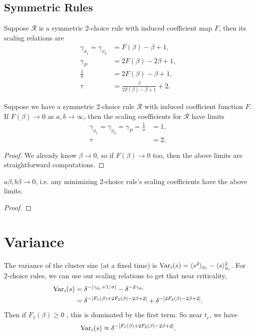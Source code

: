 \documentclass[twoside,10pt]{article}
\begin{document}
\subsection{Symmetric Rules}

Suppose $\mathcal{R}$ is a symmetric 2-choice rule with induced coefficient map $F$, then its scaling relations are
\begin{align*}
	\gamma_{\phi_1} = \gamma_{\phi_2} &= F(\beta)-\beta+1,\\
	\gamma_{P} &= 2F(\beta) - 2\beta+1,\\
	\frac{1}{\sigma}  &= 2F(\beta)-\beta+1,\\
	\tau &= \frac{\beta}{2F(\beta)-\beta+1} +2.
\end{align*}

\begin{prop}[]
	Suppose we have a symmetric 2-choice rule $\mathcal{R}$ with induced coefficient function $F$. If $F(\beta) \to 0$ as $a,b \to \infty$, then the scaling coefficients for $\mathcal{R}$ have limits
	\begin{align*}
		\gamma_{\phi_1} = \gamma_{\phi_2} = \gamma_{P} = \frac{1}{\sigma} &= 1,\\
		\tau &= 2.
	\end{align*}
\end{prop}
\begin{proof}
	We already know $\beta \to 0$, so if $F(\beta)\to 0$ too, then the above limits are straightforward computations.
\end{proof}

\begin{thrm}[]
	\label{m-beta-0}
$a \beta, b \beta \to 0$, i.e. any minimizing 2-choice rule's scaling coefficients have the above limits.
\end{thrm}
\begin{proof}
\end{proof}

\section{Variance}

The variance of the cluster size (at a fixed time) is $\operatorname{Var}_i(s) = \langle s^2 \rangle_{\phi_i} - \langle s \rangle^2_{\phi_i}$. For 2-choice rules, we can use our scaling relations to get that near criticality,
\begin{align*}
	\operatorname{Var}_i(s) &= \delta^{-[\gamma_{\phi_i} + 1/\sigma]} - \delta^{-2\gamma_{\phi_i}} \\
		  &= \delta^{-[F_1(\beta)+2F_2(\beta)-2\beta+2]} + \delta^{-[2F_2(\beta)-2\beta+2]}.
\end{align*}
Then if $F_1(\beta) \geq 0$ , this is dominated by the first term. So near $t_c$, we have
\[
	\operatorname{Var}_i(s) \approx \delta^{-[F_1(\beta)+2F_2(\beta)-2\beta+2]}.
\] 
\end{document}
